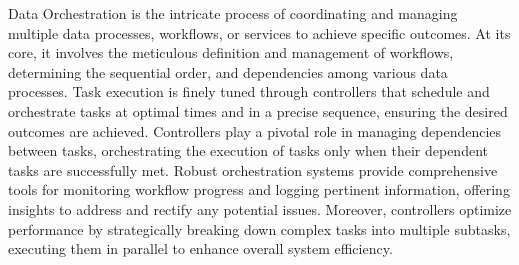 Data Orchestration is the intricate process of coordinating and managing
multiple data processes, workflows, or services to achieve specific outcomes. At
its core, it involves the meticulous definition and management of workflows,
determining the sequential order, and dependencies among various data processes.
Task execution is finely tuned through controllers that schedule and orchestrate
tasks at optimal times and in a precise sequence, ensuring the desired outcomes
are achieved. Controllers play a pivotal role in managing dependencies between
tasks, orchestrating the execution of tasks only when their dependent tasks are
successfully met. Robust orchestration systems provide comprehensive tools for
monitoring workflow progress and logging pertinent information, offering
insights to address and rectify any potential issues. Moreover, controllers
optimize performance by strategically breaking down complex tasks into multiple
subtasks, executing them in parallel to enhance overall system efficiency.